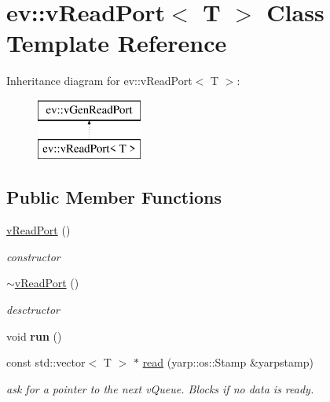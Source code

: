 \hypertarget{classev_1_1vReadPort}{}\section{ev\+:\+:v\+Read\+Port$<$ T $>$ Class Template Reference}
\label{classev_1_1vReadPort}
Inheritance diagram for ev\+:\+:v\+Read\+Port$<$ T $>$\+:\begin{figure}[H]
\begin{center}
\leavevmode
\includegraphics[height=2.000000cm]{classev_1_1vReadPort}
\end{center}
\end{figure}
\subsection*{Public Member Functions}
\begin{DoxyCompactItemize}
\item 
\hyperlink{classev_1_1vReadPort_a8c559db85d642d2779d2ea02acf75bc9}{v\+Read\+Port} ()\hypertarget{classev_1_1vReadPort_a8c559db85d642d2779d2ea02acf75bc9}{}\label{classev_1_1vReadPort_a8c559db85d642d2779d2ea02acf75bc9}

\begin{DoxyCompactList}\small\item\em constructor \end{DoxyCompactList}\item 
\hyperlink{classev_1_1vReadPort_a7ce21badb00708a6914d8620bf17c797}{$\sim$v\+Read\+Port} ()\hypertarget{classev_1_1vReadPort_a7ce21badb00708a6914d8620bf17c797}{}\label{classev_1_1vReadPort_a7ce21badb00708a6914d8620bf17c797}

\begin{DoxyCompactList}\small\item\em desctructor \end{DoxyCompactList}\item 
void {\bfseries run} ()\hypertarget{classev_1_1vReadPort_a383d2b1d3f896fce2fa352f76fe2fefb}{}\label{classev_1_1vReadPort_a383d2b1d3f896fce2fa352f76fe2fefb}

\item 
const std\+::vector$<$ T $>$ $\ast$ \hyperlink{classev_1_1vReadPort_a87d37511c497fccae9430f949b381fd1}{read} (yarp\+::os\+::\+Stamp \&yarpstamp)\hypertarget{classev_1_1vReadPort_a87d37511c497fccae9430f949b381fd1}{}\label{classev_1_1vReadPort_a87d37511c497fccae9430f949b381fd1}

\begin{DoxyCompactList}\small\item\em ask for a pointer to the next v\+Queue. Blocks if no data is ready. \end{DoxyCompactList}\end{DoxyCompactItemize}
